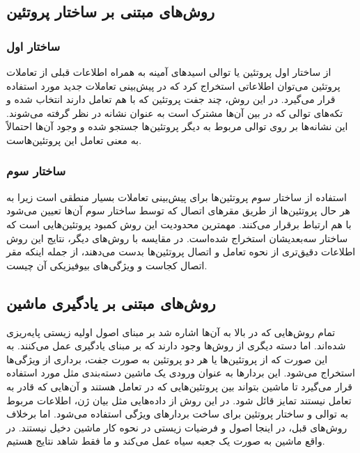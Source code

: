 \subsection{روش‌های مبتنی بر ساختار پروتئین}
\subsubsection{ساختار اول}
از ساختار اول پروتئین یا توالی اسید‌های آمینه به همراه اطلاعات قبلی از تعاملات پروتئین می‌توان اطلاعاتی استخراج کرد که در پیش‌بینی تعاملات جدید مورد استفاده قرار می‌گیرد. در این روش، چند جفت پروتئین که با هم تعامل دارند انتخاب شده و تکه‌های توالی که در بین آن‌ها مشترک است به عنوان نشانه در نظر گرفته می‌شوند. این نشانه‌ها بر روی توالی‌ مربوط به دیگر پروتئین‌ها جستجو شده و وجود آن‌ها احتمالاً به معنی تعامل این پروتئین‌هاست.

\subsubsection{ساختار سوم}
استفاده از ساختار سوم پروتئین‌ها برای پیش‌بینی تعاملات بسیار منطقی است زیرا به هر حال پروتئین‌ها از طریق مقر‌های اتصال که توسط ساختار سوم آن‌ها تعیین می‌شود با هم ارتباط برقرار می‌کنند. مهمترین محدودیت این روش کمبود پروتئین‌هایی است که ساختار سه‌بعدیشان استخراج شده‌است. در مقایسه با روش‌های دیگر، نتایج این روش اطلاعات دقیق‌تری از نحوه تعامل و اتصال پروتئین‌ها بدست می‌دهند، از جمله اینکه مقر اتصال کجاست و ویژگی‌های بیوفیزیکی آن چیست.

\subsection{روش‌های مبتنی بر یادگیری ماشین}
تمام روش‌هایی که در بالا به آن‌ها اشاره شد بر مبنای اصول اولیه زیستی پایه‌ریزی شده‌اند. اما دسته دیگری از روش‌ها وجود دارند که بر مبنای یادگیری عمل می‌کنند. به این صورت که از پروتئین‌ها یا هر دو پروتئین به صورت جفت، برداری از ویژگی‌ها استخراج می‌شود. این بردارها به عنوان ورودی یک ماشین دسته‌بندی مثل  مورد استفاده قرار می‌گیرد تا ماشین بتواند بین پروتئین‌هایی که در تعامل هستند و آن‌هایی که قادر به تعامل نیستند تمایز قائل شود. در این روش‌ از داده‌هایی مثل بیان ژن‌، اطلاعات مربوط به توالی و ساختار پروتئین‌ برای ساخت بردارهای ویژگی استفاده می‌شود. اما برخلاف روش‌های قبل، در اینجا اصول و فرضیات زیستی در نحوه کار ماشین دخیل نیستند. در واقع ماشین به صورت یک جعبه سیاه عمل می‌کند و ما فقط شاهد نتایج هستیم.

